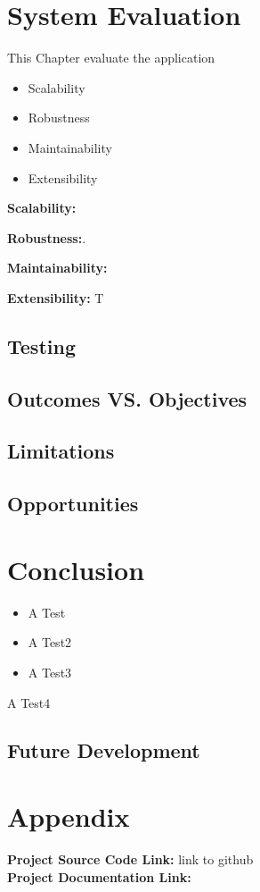 \chapter{System Evaluation}
This Chapter evaluate the application
\begin{itemize}
    \item Scalability
    \item Robustness
    \item Maintainability
    \item Extensibility
\end{itemize}

\par \textbf{Scalability:} 

\par \textbf{Robustness:}.

\par \textbf{Maintainability:}

\par \textbf{Extensibility:} T

\section{Testing}

\section{Outcomes VS. Objectives}

\section{Limitations}

\section{Opportunities}

\chapter{Conclusion}


\begin{itemize}
\item A Test

\item A Test2
\item A Test3
\end{itemize}
A Test4
\section{Future Development}

\chapter{Appendix}

\textbf{Project Source Code Link: }link to github \\
\textbf{Project Documentation Link: } \\

